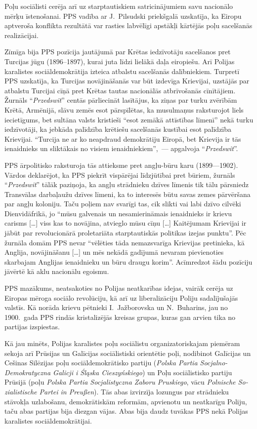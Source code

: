 \documentclass[twoside,a5paper,12pt,fleqn,openany]{extbook}
\newcommand{\pltxti}[1]{\textit{\textpolish{#1}}}
\newcommand{\detxti}[1]{\textit{\textgerman{#1}}}
\newcommand{\citespace}{[\dots{}]}
\begin{document}
Poļu sociālisti cerēja arī uz starptautiskiem satricinājumiem savu nacionālo mērķu īstenošanai. PPS vadība ar J.~Pilsudski priekšgalā uzskatīja, ka Eiropu aptveroša konflikta rezultātā var rasties labvēlīgi apstākļi kārtējās poļu sacelšanās realizācijai.

Zīmīga bija PPS pozīcija jautājumā par Krētas iedzīvotāju sacelšanos pret Turcijas jūgu (1896--1897), kurai juta līdzi lielākā daļa eiropiešu. Arī Polijas karalistes sociāldemokrātija izteica atbalstu sacelšanās dalībniekiem. Turpretī PPS uzskatīja, ka Turcijas novājināšanās var būt izdevīga Krievijai, uzstājās par atbalstu Turcijai cīņā pret Krētas tautas nacionālās atbrīvošanās cīnītājiem. Žurnāls ``\pltxti{Przedswit}'' centās pārliecināt lasītājus, ka ziņas par turku zvērībām Krētā, Armēnijā, slāvu zemēs esot pārspīlētas, ka musulmaņus raksturojot liels iecietīgums, bet sultāna valsts kristieši ``esot zemākā attīstības līmenī'' nekā turku iedzīvotāji, ka jebkāda palīdzība krētiešu sacelšanās kustībai esot palīdzība Krievijai. ``Turcija ne ar ko neapdraud demokrātiju Eiropā, bet Krievija ir tās ienaidnieks un sliktākais no visiem ienaidniekiem'',~--- apgalvoja ``\pltxti{Przedswit}''.

PPS ārpolitisko raksturoja tās attieksme pret angļu-būru karu (1899—1902). Vārdos deklarējot, ka PPS piekrīt vispārējai līdzjūtībai pret būriem, žurnāls ``\pltxti{Przedswit}'' tālāk paziņoja, ka angļu strādnieku dzīves līmenis tik tālu pārsniedz Transvālas darbaļaužu dzīves līmeni, ka to interesēs būtu savas zemes pārvēršana par angļu koloniju. Taču poļiem nav svarīgi tas, cik slikti vai labi dzīvo cilvēki Dienvidāfrikā, jo ``mūsu galvenais un nesamierināmais ienaidnieks ir krievu carisms \citespace{} viss kas to novājina, atvieglo mūsu cīņu \citespace{} Kaitējumam Krievijai ir jābūt par revolucionārā proletariāta starptautiskās politikas izejas punktu''. Pēc žurnāla domām PPS nevar ``vēlēties tāda nemazsvarīga Krievijas pretinieka, kā Anglija, novājināšanu \citespace{} un mēs nekādā gadījumā nevaram pievienoties skarbajam Anglijas ienaidnieku un būru draugu korim''. Acīmredzot šādu pozīciju jāvērtē kā aklu nacionālu egoismu.

PPS mazākums, neatsakoties no Polijas neatkarības idejas, vairāk cerēja uz Eiropas mēroga sociālo revolūciju, kā arī uz liberalizāciju Poliju sadalījušajās valstīs. Kā norāda krievu pētnieki I.~Jažborovska un N.~Buharins, jau no 1900.~gada PPS rindās kristalizējās kreisas grupas, kuras gan arvien tika no partijas izspiestas.

Kā jau minēts, Polijas karalistes poļu sociālistu organizatoriskajam piemēram sekoja arī Prūsijas un Galīcijas sociālistiski orientētie poļi, nodibinot Galīcijas un Cešinas Silēzijas poļu sociāldemokrātisko partiju (\pltxti{Polska Partia Socjalno-Demokratyczna Galicji i Śląska Cieszyńskiego}) un Poļu sociālistisko partiju Prūsijā (poļu \pltxti{Polska Partia Socjalistyczna Zaboru Pruskiego}, vācu \detxti{Polnische Sozialistische Partei in Preußen}). Tās abas izvirzīja lozungus par strādnieku stāvokļa uzlabošanu, demokrātiskām reformām, apvienotu un neatkarīgu Poliju, taču abas partijas bija diezgan vājas. Abas bija daudz tuvākas PPS nekā Polijas karalistes sociāldemokrātijai.
\end{document}

